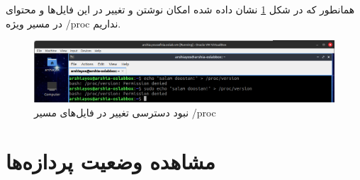 \documentclass[12pt]{article}
\begin{document}
	همانطور که در شکل \ref{fig:8} نشان داده شده امکان نوشتن و تغییر در این فایل‌ها و محتوای در مسیر ویژه /proc نداریم.
	\begin{figure}[H]
		\centering
		\includegraphics[width=\textwidth]{report3-resources/8.png}
		\caption{نبود دسترسی تغییر در فایل‌های مسیر \textenglish{/proc}}
		\label{fig:8}
	\end{figure}
	
	\section{مشاهده وضعیت پردازه‌ها}
	
\end{document}
